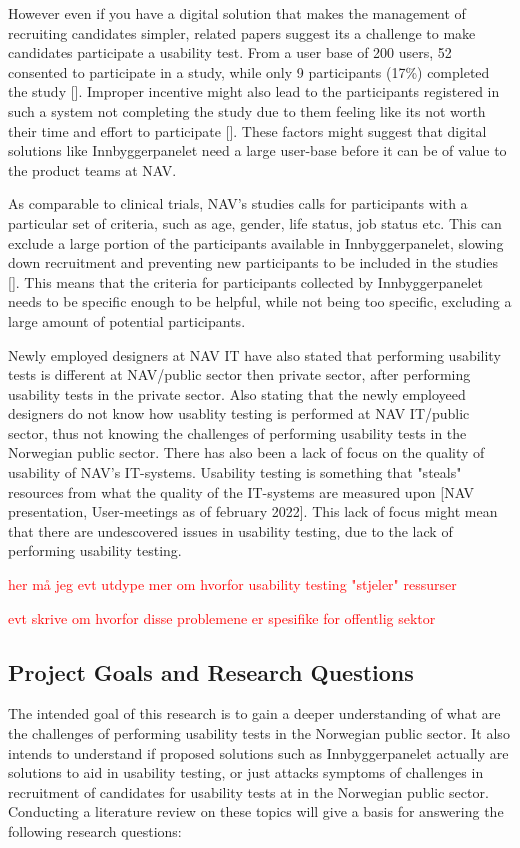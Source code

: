 However even if you have a digital solution that makes the management of recruiting candidates simpler, related papers suggest its a challenge to make candidates participate a usability test. From a user base of 200 users, 52 consented to participate in a study, while only 9 participants (17\%) completed the study [\cite{pkf_2018}]. Improper incentive might also lead to the participants registered in such a system not completing the study due to them feeling like its not worth their time and effort to participate [\cite{pkf_2018}]. These factors might suggest that digital solutions like Innbyggerpanelet need a large user-base before it can be of value to the product teams at NAV.

As comparable to clinical trials, NAV's studies calls for participants with a particular set of criteria, such as age, gender, life status, job status etc. This can exclude a large portion of the participants available in Innbyggerpanelet, slowing down recruitment and preventing new participants to be included in the studies [\cite{nc_2020}]. This means that the criteria for participants collected by Innbyggerpanelet needs to be specific enough to be helpful, while not being too specific, excluding a large amount of potential participants.

Newly employed designers at NAV IT have also stated that performing usability tests is different at NAV/public sector then private sector, after performing usability tests in the private sector. Also stating that the newly employeed designers do not know how usablity testing is performed at NAV IT/public sector, thus not knowing the challenges of performing usability tests in the Norwegian public sector. There has also been a lack of focus on the quality of usability of NAV's IT-systems. Usability testing is something that "steals" resources from what the quality of the IT-systems are measured upon [NAV presentation, User-meetings as of february 2022]. This lack of focus might mean that there are undescovered issues in usability testing, due to the lack of performing usability testing.

\textcolor{red}{her må jeg evt utdype mer om hvorfor usability testing "stjeler" ressurser}

\textcolor{red}{evt skrive om hvorfor disse problemene er spesifike for offentlig sektor}

\subsection{Project Goals and Research Questions}
The intended goal of this research is to gain a deeper understanding of what are the challenges of performing usability tests in the Norwegian public sector. It also intends to understand if proposed solutions such as Innbyggerpanelet actually are solutions to aid in usability testing, or just attacks symptoms of challenges in recruitment of candidates for usability tests at in the Norwegian public sector. Conducting a literature review on these topics will give a basis for answering the following research questions: 

